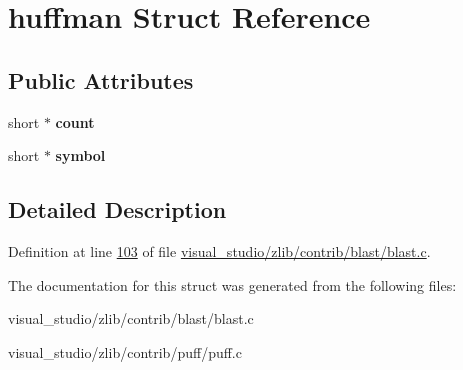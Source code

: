 \hypertarget{structhuffman}{}\section{huffman Struct Reference}
\label{structhuffman}
\subsection*{Public Attributes}
\begin{DoxyCompactItemize}
\item 
\mbox{\label{structhuffman_aa840fbb40b96c7d4a9ab84ff67a9150c}} 
short $\ast$ {\bfseries count}
\item 
\mbox{\label{structhuffman_abe59777de15e216f772e4d430db93576}} 
short $\ast$ {\bfseries symbol}
\end{DoxyCompactItemize}


\subsection{Detailed Description}


Definition at line \hyperlink{visual__studio_2zlib_2contrib_2blast_2blast_8c_source_l00103}{103} of file \hyperlink{visual__studio_2zlib_2contrib_2blast_2blast_8c_source}{visual\+\_\+studio/zlib/contrib/blast/blast.\+c}.



The documentation for this struct was generated from the following files\+:\begin{DoxyCompactItemize}
\item 
visual\+\_\+studio/zlib/contrib/blast/blast.\+c\item 
visual\+\_\+studio/zlib/contrib/puff/puff.\+c\end{DoxyCompactItemize}
